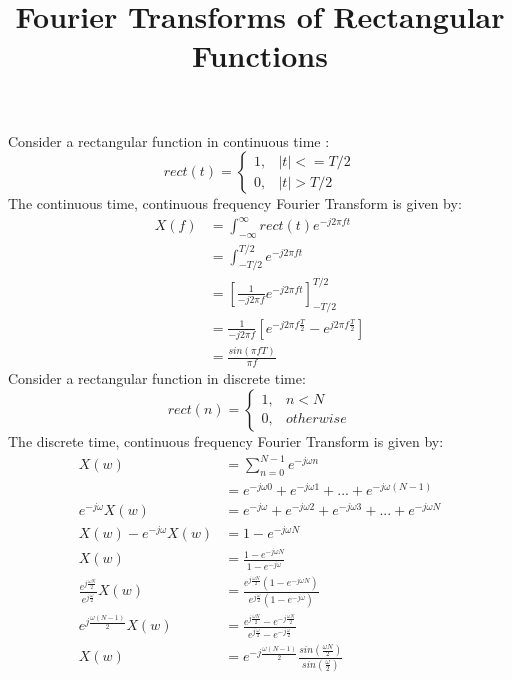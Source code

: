 \documentclass{article}
\begin{document}
\title{Fourier Transforms of Rectangular Functions}
\maketitle

Consider a rectangular function in continuous time \cite{wikipedia_rect}:
\begin{equation}
rect(t)= 
	\begin{cases}
      1, & |t| <= T/2 \\
      0, & |t| > T/2
	\end{cases}
\end{equation}
The continuous time, continuous frequency Fourier Transform is given by:
\begin{equation} \label{eq:ctcf}
\begin{split}
X(f) &= \int_{-\infty}^{\infty} rect(t)e^{-j2 \pi ft} \\
     &= \int_{-T/2}^{T/2} e^{-j 2 \pi ft} \\
     &= \left[ \frac{1}{-j 2 \pi f} e^{-j 2 \pi ft} \right]_{-T/2}^{T/2} \\
     &= \frac{1}{-j 2 \pi f} \left[  e^{-j 2 \pi f \frac{T}{2}} - e^{j 2 \pi f \frac{T}{2}} \right] \\
     &= \frac{sin(\pi f T)}{\pi f}
\end{split}
\end{equation}
Consider a rectangular function in discrete time:
\begin{equation}
rect(n)= 
	\begin{cases}
      1, & n < N \\
      0, & otherwise
	\end{cases}
\end{equation}
The discrete time, continuous frequency Fourier Transform is given by:
\begin{equation}
\begin{split}
                     X(w) &= \sum_{n=0}^{N-1} e^{-j \omega n} \\
                          &= e^{-j \omega 0} + e^{-j \omega 1} + ... + e^{-j \omega (N-1)} \\
       e^{-j \omega} X(w) &= e^{-j \omega} + e^{-j \omega 2} + e^{-j \omega 3} + ... + e^{-j \omega N} \\
X(w) - e^{-j \omega} X(w) &= 1 - e^{-j \omega N} \\
                     X(w) &= \frac{1 - e^{-j \omega N}}{1 - e^{-j \omega}} \\
\frac{e^{j \frac{\omega N}{2}}}{e^{j \frac{\omega}{2}}} X(w) &= \frac{e^{j \frac{\omega N}{2}}(1 - e^{-j \omega N})}{e^{j \frac{\omega}{2}}(1 - e^{-j \omega})} \\
e^{j \frac{\omega (N-1)}{2}} X(w) &= \frac{e^{j \frac{\omega N}{2}} - e^{-j \frac{\omega N}{2}}}{e^{j \frac{\omega}{2}} - e^{-j \frac{\omega}{2}}} \\
X(w) &= e^{-j \frac{\omega (N-1)}{2}} \frac{sin(\frac{\omega N}{2})}{sin(\frac{\omega}{2})}
\end{split}
\end{equation}
\end{document}
